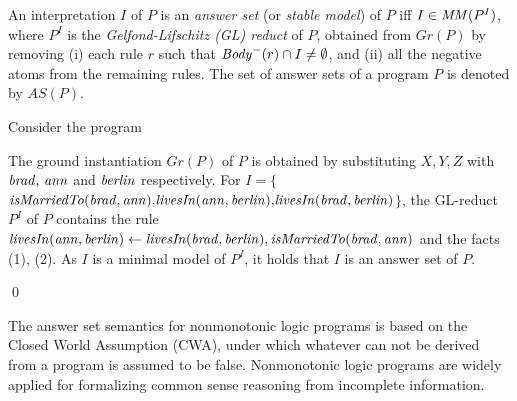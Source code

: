 An interpretation $I$ of $P$ is an \emph{answer set} (or \emph{stable model}) of $P$ iff $I \in \mathit{MM}(P^I)$, where $P^I$ is the \emph{Gelfond-Lifschitz (GL) reduct} \cite{GL1988} of $P$, obtained from $Gr(P)$ by removing (i) each rule $r$ such that $\mathit{Body}^-(r) \cap I\neq\emptyset$, and (ii) all the negative atoms from the remaining rules. The set of answer sets of a program $P$ is denoted by $AS(P)$.

\begin{example}\label{ex:as}
Consider the program \\
{\small {}}
            
\normalsize
{\smallskip

\noindent            
The ground instantiation $Gr(P)$ of $P$ is obtained by substituting $X,Y,Z$ with $\mathit{brad, \,ann}$ and $\mathit{berlin}$ respectively. For $I{=}\{${\small$\mathit{isMarriedTo(brad,ann){,}livesIn(ann,berlin)}{,}\\ \mathit{livesIn(brad,berlin)}$}$\}$, the GL-reduct $P^I$ of $P$ contains the rule $\mathit{livesIn(ann,berlin)}\leftarrow \mathit{livesIn(brad,berlin),isMarriedTo(brad,ann)}$ and the facts (1), (2). As $I$ is a minimal model of $P^I$, it holds that $I$ is an answer set of $P$.}\qed
\end{example}
\normalsize
The answer set semantics for nonmonotonic logic programs is based on the Closed World Assumption (CWA), under which whatever can not be derived from a program is assumed to be false. Nonmonotonic logic programs are widely applied for formalizing common sense reasoning from incomplete information.


